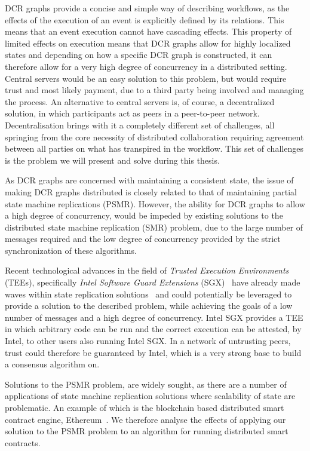 \documentclass{article}
\begin{document}
	DCR graphs provide a concise and simple way of describing workflows, as the effects of the execution of an event is explicitly defined by its relations.
	This means that an event execution cannot have cascading effects.
	This property of limited effects on execution means that DCR graphs allow for highly localized states and depending on how a specific DCR graph is constructed, it can therefore allow for a very high degree of concurrency in a distributed setting.
	Central servers would be an easy solution to this problem, but would require trust and most likely payment, due to a third party being involved and managing the process.
	An alternative to central servers is, of course, a decentralized solution, in which participants act as peers in a peer-to-peer network.
	Decentralisation brings with it a completely different set of challenges, all springing from the core necessity of distributed collaboration requiring agreement between all parties on what has transpired in the workflow.
	This set of challenges is the problem we will present and solve during this thesis.

	As DCR graphs are concerned with maintaining a consistent state, the issue of making DCR graphs distributed is closely related to that of maintaining partial state machine replications (PSMR).
	However, the ability for DCR graphs to allow a high degree of concurrency, would be impeded by existing solutions to the distributed state machine replication (SMR) problem, due to the large number of messages required and the low degree of concurrency provided by the strict synchronization of these algorithms.

	Recent technological advances in the field of \textit{Trusted Execution Environments} (TEEs), specifically \textit{Intel Software Guard Extensions} (SGX)~\cite{costan_intel_2016} have already made waves within state replication solutions~\cite{kapitza_cheapbft_2012,veronese_efficient_2013,liu_scalable_2016} and could potentially be leveraged to provide a solution to the described problem, while achieving the goals of a low number of messages and a high degree of concurrency.
	Intel SGX provides a TEE in which arbitrary code can be run and the correct execution can be attested, by Intel, to other users also running Intel SGX.
	In a network of untrusting peers, trust could therefore be guaranteed by Intel, which is a very strong base to build a consensus algorithm on.

	Solutions to the PSMR problem, are widely sought, as there are a number of applications of state machine replication solutions where scalability of state are problematic.
	An example of which is the blockchain based distributed smart contract engine, Ethereum~\cite{_ethereum_2018}.
	We therefore analyse the effects of applying our solution to the PSMR problem to an algorithm for running distributed smart contracts.
\end{document}
